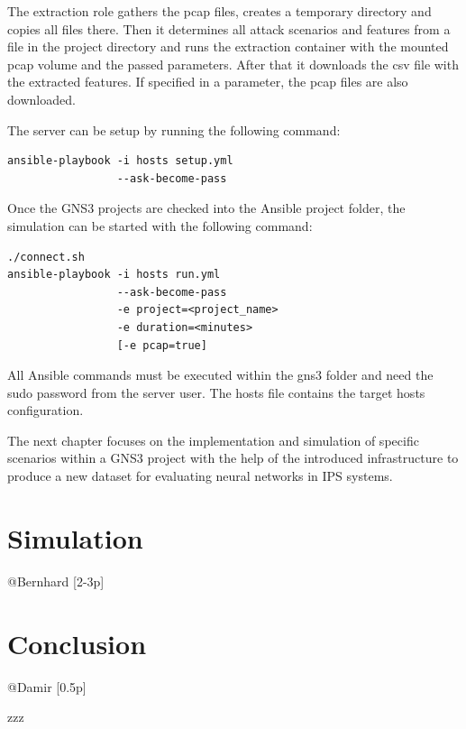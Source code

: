 \documentclass[conference]{IEEEtran}
\begin{document}
The extraction role gathers the pcap files, creates a temporary directory and copies all files there. Then it determines all attack scenarios and features from a file in the project directory and runs the extraction container with the mounted pcap volume and the passed parameters. After that it downloads the csv file with the extracted features. If specified in a parameter, the pcap files are also downloaded.

The server can be setup by running the following command:
\begin{verbatim}
ansible-playbook -i hosts setup.yml 
                 --ask-become-pass
\end{verbatim}

Once the GNS3 projects are checked into the Ansible project folder, the simulation can be started with the following command:
\begin{verbatim}
./connect.sh
ansible-playbook -i hosts run.yml
                 --ask-become-pass
                 -e project=<project_name>
                 -e duration=<minutes>
                 [-e pcap=true]
\end{verbatim}

All Ansible commands must be executed within the gns3 folder and need the sudo password from the server user. The hosts file contains the target hosts configuration.

The next chapter focuses on the implementation and simulation of specific scenarios within a GNS3 project with the help of the introduced infrastructure to produce a new dataset for evaluating neural networks in IPS systems.  

\section{Simulation}
@Bernhard [2-3p]

\section{Conclusion}
@Damir [0.5p]

\begin{thebibliography}{00}
 zzz
\end{thebibliography}
\end{document}
